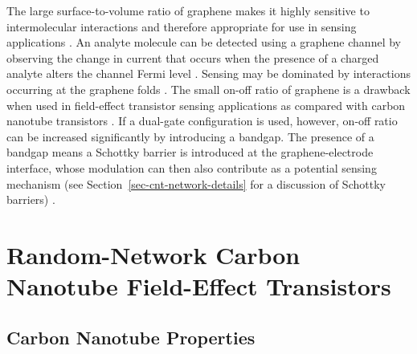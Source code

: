 \documentclass[
  a4paper,
]{scrbook}
\begin{document}
The large surface-to-volume ratio of graphene makes it highly sensitive
to intermolecular interactions and therefore appropriate for use in
sensing applications \autocite{Ohno2015,Tran2016}. An analyte molecule
can be detected using a graphene channel by observing the change in
current that occurs when the presence of a charged analyte alters the
channel Fermi level \autocite{Heller2010,Ohno2015}. Sensing may be
dominated by interactions occurring at the graphene folds
\autocite{Zhao2012}. The small on-off ratio of graphene is a drawback
when used in field-effect transistor sensing applications as compared
with carbon nanotube transistors \autocite{Novoselov2004}. If a
dual-gate configuration is used, however, on-off ratio can be increased
significantly by introducing a bandgap. The presence of a bandgap means
a Schottky barrier is introduced at the graphene-electrode interface,
whose modulation can then also contribute as a potential sensing
mechanism (see Section~\ref{sec-cnt-network-details} for a discussion of
Schottky barriers) \autocite{Xia2010}.

\hypertarget{random-network-carbon-nanotube-field-effect-transistors}{%
\section{Random-Network Carbon Nanotube Field-Effect
Transistors}\label{random-network-carbon-nanotube-field-effect-transistors}}

\hypertarget{sec-carbon-nanotubes}{%
\subsection{Carbon Nanotube Properties}\label{sec-carbon-nanotubes}}
\end{document}
